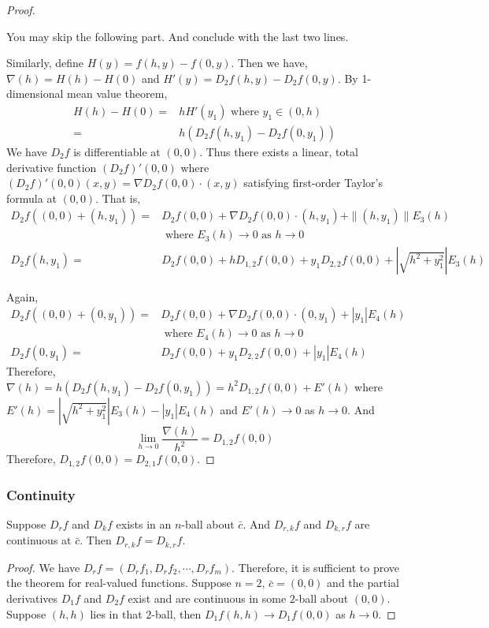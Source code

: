\begin{proof}
\begin{commentary}
	You may skip the following part.
	And conclude with the last two lines.
\end{commentary}

Similarly, define $H(y) = f(h,y)-f(0,y)$.
Then we have, $\nabla(h) = H(h)-H(0)$ and $H'(y) = D_2f(h,y) - D_2f(0,y)$.
By 1-dimensional mean value theorem,
\begin{align*}
	H(h)-H(0) = & hH'(y_1)  \text{ where } y_1 \in (0,h) \\
	= & h \left( D_2f(h,y_1)-D_2f(0,y_1) \right)
\end{align*}
We have $D_2 f$ is differentiable at $(0,0)$.
Thus there exists a linear, total derivative function $(D_2f)'(0,0)$ where $(D_2f)'(0,0)(x,y) = \nabla D_2 f(0,0) \cdot{} (x,y)$ satisfying first-order Taylor's formula at $(0,0)$.
That is,
\begin{align*}
	D_2 f((0,0)+(h,y_1)) = & D_2 f(0,0) + \nabla D_2 f(0,0) \cdot{} (h,y_1) + \|(h,y_1)\| E_3(h) \\
	& \text{ where } E_3(h) \to 0 \text{ as } h \to 0 \\
	D_2 f(h,y_1) = & D_2 f(0,0) + h D_{1,2} f(0,0) + y_1 D_{2,2} f(0,0) + \left|\sqrt{h^2+y_1^2}\right| E_3(h)
\end{align*}

Again,
\begin{align*}
	D_2 f((0,0)+(0,y_1)) = & D_2 f(0,0) + \nabla D_2 f(0,0) \cdot{} (0,y_1) + |y_1| E_4(h) \\
	& \text{ where } E_4(h) \to 0 \text{ as } h \to 0 \\
	D_2 f(0,y_1) = & D_2 f(0,0) + y_1 D_{2,2} f(0,0) + |y_1| E_4(h)
\end{align*}
Therefore, $\nabla(h) = h( D_2 f(h,y_1) - D_2 f(0,y_1) ) = h^2 D_{1,2} f(0,0) + E'(h)$ where $E'(h) = \left|\sqrt{h^2+y_1^2}\right| E_3(h) - |y_1|E_4(h)$ and $E'(h) \to 0$ as $h \to 0$. And 
\begin{equation}
	\lim_{h \to 0} \frac{\nabla(h)}{h^2}  = D_{1,2} f(0,0)
\end{equation}
Therefore, $D_{1,2} f(0,0) = D_{2,1} f(0,0)$.
\end{proof}

\subsubsection{Continuity}
\begin{theorem}
Suppose $D_r f$ and $D_k f$ exists in an $n$-ball about $\bar{c}$.
And $D_{r,k} f$ and $D_{k,r} f$ are continuous at $\bar{c}$.
Then $D_{r,k} f = D_{k,r} f$.
\end{theorem}
\begin{proof}
We have $D_r f = (D_r f_1 , D_r f_2, \cdots, D_r f_m)$.
Therefore, it is sufficient to prove the theorem for real-valued functions.
Suppose $n = 2$, $\bar{c} = (0,0)$ and the partial derivatives $D_1 f$ and $D_2 f$ exist and are continuous in some $2$-ball about $(0,0)$.
Suppose $(h,h)$ lies in that $2$-ball, then $D_1 f(h,h) \to D_1 f(0,0)$ as $h \to 0$.
\end{proof}


